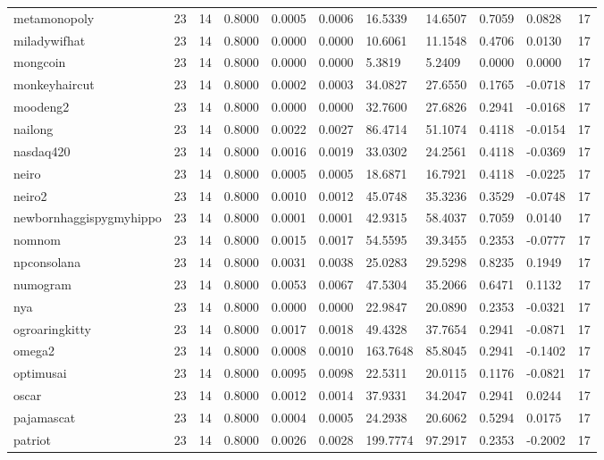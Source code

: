 \begin{table}[htbp]
\begin{tabular}{lllllllllll}
metamonopoly & 23 & 14 & 0.8000 & 0.0005 & 0.0006 & 16.5339 & 14.6507 & 0.7059 & 0.0828 & 17 \\
miladywifhat & 23 & 14 & 0.8000 & 0.0000 & 0.0000 & 10.6061 & 11.1548 & 0.4706 & 0.0130 & 17 \\
mongcoin & 23 & 14 & 0.8000 & 0.0000 & 0.0000 & 5.3819 & 5.2409 & 0.0000 & 0.0000 & 17 \\
monkeyhaircut & 23 & 14 & 0.8000 & 0.0002 & 0.0003 & 34.0827 & 27.6550 & 0.1765 & -0.0718 & 17 \\
moodeng2 & 23 & 14 & 0.8000 & 0.0000 & 0.0000 & 32.7600 & 27.6826 & 0.2941 & -0.0168 & 17 \\
nailong & 23 & 14 & 0.8000 & 0.0022 & 0.0027 & 86.4714 & 51.1074 & 0.4118 & -0.0154 & 17 \\
nasdaq420 & 23 & 14 & 0.8000 & 0.0016 & 0.0019 & 33.0302 & 24.2561 & 0.4118 & -0.0369 & 17 \\
neiro & 23 & 14 & 0.8000 & 0.0005 & 0.0005 & 18.6871 & 16.7921 & 0.4118 & -0.0225 & 17 \\
neiro2 & 23 & 14 & 0.8000 & 0.0010 & 0.0012 & 45.0748 & 35.3236 & 0.3529 & -0.0748 & 17 \\
newbornhaggispygmyhippo & 23 & 14 & 0.8000 & 0.0001 & 0.0001 & 42.9315 & 58.4037 & 0.7059 & 0.0140 & 17 \\
nomnom & 23 & 14 & 0.8000 & 0.0015 & 0.0017 & 54.5595 & 39.3455 & 0.2353 & -0.0777 & 17 \\
npconsolana & 23 & 14 & 0.8000 & 0.0031 & 0.0038 & 25.0283 & 29.5298 & 0.8235 & 0.1949 & 17 \\
numogram & 23 & 14 & 0.8000 & 0.0053 & 0.0067 & 47.5304 & 35.2066 & 0.6471 & 0.1132 & 17 \\
nya & 23 & 14 & 0.8000 & 0.0000 & 0.0000 & 22.9847 & 20.0890 & 0.2353 & -0.0321 & 17 \\
ogroaringkitty & 23 & 14 & 0.8000 & 0.0017 & 0.0018 & 49.4328 & 37.7654 & 0.2941 & -0.0871 & 17 \\
omega2 & 23 & 14 & 0.8000 & 0.0008 & 0.0010 & 163.7648 & 85.8045 & 0.2941 & -0.1402 & 17 \\
optimusai & 23 & 14 & 0.8000 & 0.0095 & 0.0098 & 22.5311 & 20.0115 & 0.1176 & -0.0821 & 17 \\
oscar & 23 & 14 & 0.8000 & 0.0012 & 0.0014 & 37.9331 & 34.2047 & 0.2941 & 0.0244 & 17 \\
pajamascat & 23 & 14 & 0.8000 & 0.0004 & 0.0005 & 24.2938 & 20.6062 & 0.5294 & 0.0175 & 17 \\
patriot & 23 & 14 & 0.8000 & 0.0026 & 0.0028 & 199.7774 & 97.2917 & 0.2353 & -0.2002 & 17 \\

\end{tabular}
\end{table}
